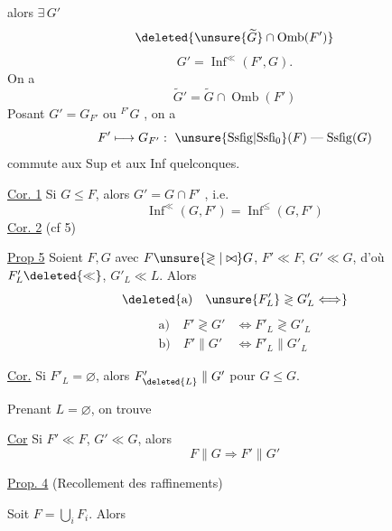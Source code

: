 alors $\exists\,G'$ 
\[
\deleted{\unsure{\widetilde G}\cap\operatorname{Omb}(F')}
\]
\[
G'=\operatorname{Inf}^{\ll}(F',G).
\]
On a
\[
\widetilde G'=\widetilde G\cap\operatorname{Omb}(F')
\]
Posant $G'=G_{F'}$  ou ${}^{F'}G$ , on a
\[
F'\longmapsto G_{F'}:\ \unsure{\mathrm{Ssfig}|\mathrm{Ssfi}_0}(F)\;\text{---}\;\mathrm{Ssfig}(G)
\]
 commute aux Sup et aux Inf quelconques.


\uline{Cor. 1} Si $G\leq F$, alors $G'=G\cap F'$ , i.e.
\[
\operatorname{Inf}^{\ll}(G,F')=\operatorname{Inf}^{\leq}(G,F')
\]
\uline{Cor. 2} (cf   5)

\uline{Prop 5} Soient $F,G$ avec $F\unsure{\gtrless|\bowtie}G$,  $F'\ll F$, $G'\ll G$, d'où $F'_L\deleted{\ll}$, $G'_L\ll L$. Alors
\[
\deleted{\text{a)}\quad\unsure{F'_L}\gtrless G'_L\Longleftrightarrow}
\]
\[
\begin{aligned}
\text{a)}\quad F'\gtrless G'&\Longleftrightarrow F'_L\gtrless G'_L\\
\text{b)}\quad F'\parallel G'&\Longleftrightarrow F'_L\parallel G'_L
\end{aligned}
\]

\uline{Cor.} Si $F'_L=\varnothing$, alors $F'_{\deleted{L}}\parallel G'$ pour  $G\leq G$.


Prenant $L=\varnothing$, on trouve

\uline{Cor}  Si $F'\ll F$, $G'\ll G$, alors
\[
F\parallel G\Longrightarrow F'\parallel G'
\]


\uline{Prop. 4} (Recollement des raffinements)

Soit $F=\bigcup_i F_i$. Alors 

